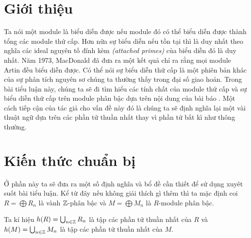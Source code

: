 




\section{Giới thiệu}
Ta nói một module là biểu diễn được nếu module đó có thể biểu diễn được thành tổng các module thứ cấp. Hơn nữa sự biểu diễn nếu tồn tại thì là duy nhất theo nghĩa các ideal nguyên tố đính kèm \textit{(attached primes)} của biểu diễn đó là duy nhất. Năm 1973, MacDonald đã đưa ra một kết quả chỉ ra rằng mọi module Artin đều biểu diễn được. Có thể nói sự biểu diễn thứ cấp là một phiên bản khác của sự phân tích nguyên sơ chúng ta thường thấy trong đại số giao hoán. Trong bài tiểu luận này, chúng ta sẽ đi tìm hiểu các tính chất của module thứ cấp và sự biểu diễn thứ cấp trên module phân bậc dựa trên nội dung của bài báo \cite{AFGraded}. Một cách tiếp cận của tác giả cho vấn đề này đó là chúng ta sẽ định nghĩa lại một vài thuật ngữ dựa trên các phần tử thuần nhất thay vì phần tử bất kì như thông thường.

\section{Kiến thức chuẩn bị}
Ở phần này ta sẽ đưa ra một số định nghĩa và bổ đề cần thiết để sử dụng xuyêt suốt bài tiểu luận. Kể từ đây nếu không giải thích gì thêm thì ta mặc định coi $R = \bigoplus R_n$ là vành $\mathbb Z$-phân bậc và $M = \bigoplus M_n$ là $R$-module phân bậc.

\begin{define}
    Ta kí hiệu $h(R) = \bigcup_{n \in \mathbb Z}R_n$ là tập các phần tử thuần nhất của $R$ và $h(M) = \bigcup_{n \in \mathbb Z}M_n$ là tập các phần tử thuần nhất của $M$.
\end{define}

